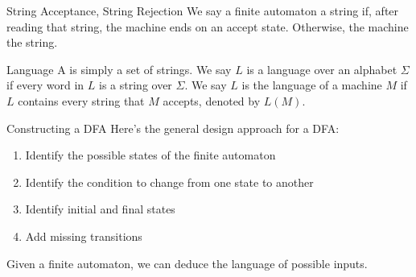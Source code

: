 \documentclass[math]{amznotes}
\begin{document}
\begin{dfnbox}{String Acceptance, String Rejection}{}
    We say a finite automaton  a string if, after reading that string, the machine ends on an accept state. Otherwise, the machine  the string.
\end{dfnbox}

\begin{dfnbox}{Language }{}
    A  is simply a set of strings. We say $L$ is a language over an alphabet $\Sigma$ if every word in $L$ is a string over $\Sigma$. We say $L$ is the language of a machine $M$ if $L$ contains every string that $M$ accepts, denoted by $L(M)$.
\end{dfnbox}

\begin{tecbox}{Constructing a DFA}{}
    Here's the general design approach for a DFA:
    \begin{enumerate}[noitemsep]
        \item Identify the possible states of the finite automaton
        \item Identify the condition to change from one state to another
        \item Identify initial and final states
        \item Add missing transitions
    \end{enumerate}
\end{tecbox}

Given a finite automaton, we can deduce the language of possible inputs.
\end{document}
